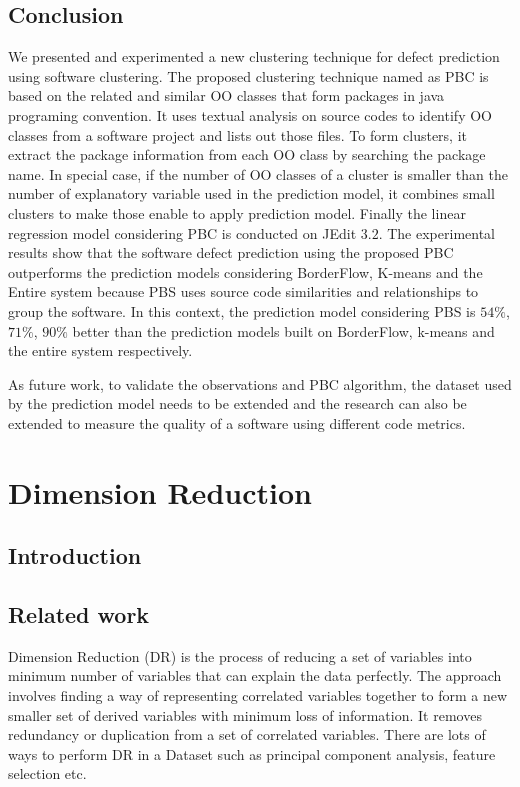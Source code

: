 \documentclass[12pt]{report}
\begin{document}
\section{Conclusion}

We presented and experimented a new clustering technique for defect prediction using software clustering. The proposed clustering technique named as PBC is based on the related and similar OO classes that form packages in java programing convention. It uses textual analysis on source codes to identify OO classes from a software project and lists out those files. To form clusters, it extract the package information from each OO class by searching the package name. In special case, if the number of OO classes of a cluster is smaller than the number of explanatory variable used in the prediction model, it combines small clusters to make those enable to apply prediction model. Finally the linear regression model considering PBC is conducted on JEdit $3.2$. The experimental results show that the software defect prediction using the proposed PBC outperforms the prediction models considering BorderFlow, K-means and the Entire system because PBS uses source code similarities and relationships to group the software. In this context, the prediction model considering PBS is  $54\%$, $71\%$, $90\%$ better than the prediction models built on BorderFlow, k-means and the entire system respectively. 

As future work, to validate the observations and PBC algorithm, the dataset used by the prediction model needs to be extended and the research can also be extended to measure the quality of a software using different code metrics.  

\chapter{Dimension Reduction}
\section{Introduction}

\section{Related work}

Dimension Reduction (DR) is the process of reducing a set of variables into minimum number of variables that can explain the data perfectly. The approach involves finding a way of representing correlated variables together to form a new smaller set of derived variables with minimum loss of information. It removes redundancy or duplication from a set of correlated variables. There are lots of ways to perform DR in a Dataset such as principal component analysis, feature selection etc.
\end{document}
